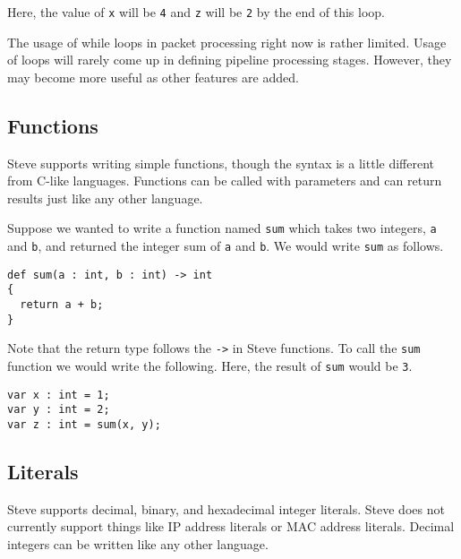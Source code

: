 Here, the value of \texttt{x} will be \texttt{4} and \texttt{z} will be
\texttt{2} by the end of this loop.

The usage of while loops in packet processing right now is rather limited. Usage
of loops will rarely come up in defining pipeline processing stages. However,
they may become more useful as other features are added.

\subsection{Functions} \label{tut:function}

Steve supports writing simple functions, though the syntax is a little different
from C-like languages. Functions can be called with parameters and can return
results just like any other language.

Suppose we wanted to write a function named \texttt{sum} which takes two
integers, \texttt{a} and \texttt{b}, and returned the integer sum of \texttt{a}
and \texttt{b}. We would write \texttt{sum} as follows.

\begin{codepage}
\begin{lstlisting}
def sum(a : int, b : int) -> int
{
  return a + b;
}
\end{lstlisting}
\end{codepage}

Note that the return type follows the \texttt{->} in Steve functions. To call
the \texttt{sum} function we would write the following. Here, the result of
\texttt{sum} would be \texttt{3}.

\begin{codepage}
\begin{lstlisting}
var x : int = 1;
var y : int = 2;
var z : int = sum(x, y);
\end{lstlisting}
\end{codepage}

\subsection{Literals} \label{tut:literal}


Steve supports decimal, binary, and hexadecimal integer literals. Steve does not
currently support things like IP address literals or MAC address literals.
Decimal integers can be written like any other language.

